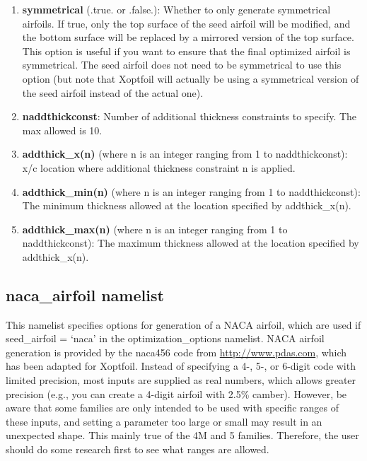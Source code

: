 \documentclass[11pt]{article}
\begin{document}
\begin{enumerate}
{default is 0.1.} 
\item{\textbf{symmetrical} (.true. or .false.): Whether to only generate symmetrical 
airfoils.  If true, only the top surface of the seed airfoil will be modified, and the
bottom surface will be replaced by a mirrored version of the top surface. This option is
useful if you want to ensure that the final optimized airfoil is symmetrical.  The seed 
airfoil does not need
to be symmetrical to use this option (but note that Xoptfoil will actually be using a
symmetrical version of the seed airfoil instead of the actual one).}
\item{\textbf{naddthickconst}: Number of additional thickness constraints to specify. The
max allowed is 10.}
\item{\textbf{addthick\_x(n)} (where n is an integer ranging from 1 to naddthickconst):
x/c location where additional thickness constraint n is applied.}
\item{\textbf{addthick\_min(n)} (where n is an integer ranging from 1 to naddthickconst):
The minimum thickness allowed at the location specified by addthick\_x(n).}
\item{\textbf{addthick\_max(n)} (where n is an integer ranging from 1 to naddthickconst):
The maximum thickness allowed at the location specified by addthick\_x(n).}
\end{enumerate}

\subsection{naca\_airfoil namelist}

This namelist specifies options for generation of a NACA airfoil, which are used if 
seed\_airfoil = `naca' in the optimization\_options namelist. NACA airfoil generation is
provided by the naca456 code from \url{http://www.pdas.com}, which has been adapted for
Xoptfoil. Instead of specifying a 4-, 5-, or 6-digit code with limited precision, most
inputs are supplied as real numbers, which allows greater precision (e.g., you can create
a 4-digit airfoil with 2.5\% camber). However, be aware that some families are only
intended to be used with specific ranges of these inputs, and setting a parameter too
large or small may result in an unexpected shape. This mainly true of the 4M and 5
families. Therefore, the user should do some research first to see what ranges are
allowed.
\end{document}

